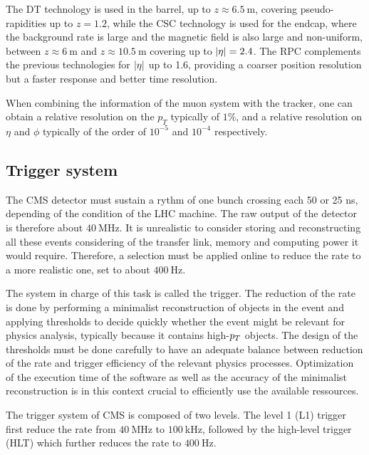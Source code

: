         The DT technology is used in the barrel, up to $z \approx 6.5~\text{m}$, covering
        pseudo-rapidities up to $z = 1.2$, while the CSC technology is used for the endcap,
        where the background rate is large and the magnetic field is also large and non-uniform,
        between $z \approx 6~\text{m}$ and $z \approx 10.5~\text{m}$ covering up to $\left| \eta \right| = 2.4$.
        The RPC complements the previous technologies for $\left| \eta \right|$ up to 1.6, providing a
        coarser position resolution but a faster response and better time resolution.

        When combining the information of the muon system with the tracker, one can
        obtain a relative resolution on the $p_T$ typically of $1\%$, and a relative
        resolution on $\eta$ and $\phi$ typically of the order of $10^{-5}$ and $10^{-4}$
        respectively.

        \subsection{Trigger system}


        The CMS detector must sustain a rythm of one bunch crossing each 50 or 25 ns, depending
        of the condition of the LHC machine. The raw output of the detector is therefore
        about $40~$MHz. It is unrealistic to consider storing and reconstructing all these events
        considering of the transfer link, memory and computing power it would require.
        Therefore, a selection must be applied online to reduce the rate to a more realistic
        one, set to about $400~$Hz.

        The system in charge of this task is called the trigger. The reduction of the rate
        is done by performing a minimalist reconstruction of objects in the event
        and applying thresholds to decide quickly whether the event might be relevant for
        physics analysis, typically because it contains high-$p_T$ objects. The design of
        the thresholds must be done carefully to have an adequate balance between reduction
        of the rate and trigger efficiency of the relevant physics processes. Optimization
        of the execution time of the software as well as the accuracy of the minimalist
        reconstruction is in this context crucial to efficiently use the available ressources.

        The trigger system of CMS is composed of two levels. The level 1 (L1) trigger first
        reduce the rate from $40~$MHz to $100~$kHz, followed by the high-level trigger (HLT)
        which further reduces the rate to $400~$Hz.

